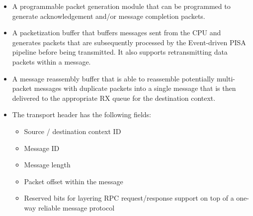 \begin{itemize}
\begin{itemize}
        \item A programmable packet generation module that can be programmed to generate acknowledgement and/or message completion packets.
        \item A packetization buffer that buffers messages sent from the CPU and generates packets that are subsequently processed by the Event-driven PISA pipeline before being transmitted. It also supports retransmitting data packets within a message.
        \item A message reassembly buffer that is able to reassemble potentially multi-packet messages with duplicate packets into a single message that is then delivered to the appropriate RX queue for the destination context.
        \item The transport header has the following fields:
        \begin{itemize}
            \item Source / destination context ID
            \item Message ID
            \item Message length
            \item Packet offset within the message
            \item Reserved bits for layering RPC request/response support on top of a one-way reliable message protocol
        \end{itemize}
    \end{itemize}
\end{itemize}

